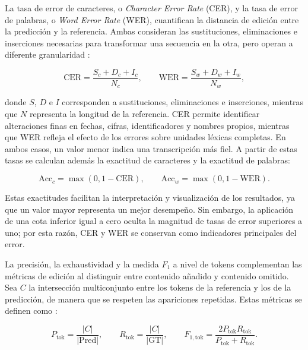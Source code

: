 La tasa de error de caracteres, o \textit{Character Error Rate} (CER), y la tasa de error de palabras, o \textit{Word Error Rate} (WER), cuantifican la distancia de edición entre la predicción y la referencia. Ambas consideran las sustituciones, eliminaciones e inserciones necesarias para transformar una secuencia en la otra, pero operan a diferente granularidad \cite{santos2019ocreval}:

\begin{equation}
    \mathrm{CER}
    =
    \frac{S_c+D_c+I_c}{N_c},
    \qquad
    \mathrm{WER}
    =
    \frac{S_w+D_w+I_w}{N_w},
    \label{eq:cer_wer}
\end{equation}

donde $S$, $D$ e $I$ corresponden a sustituciones, eliminaciones e inserciones, mientras que $N$ representa la longitud de la referencia. CER permite identificar alteraciones finas en fechas, cifras, identificadores y nombres propios, mientras que WER refleja el efecto de los errores sobre unidades léxicas completas. En ambos casos, un valor menor indica una transcripción más fiel. A partir de estas tasas se calculan además la exactitud de caracteres y la exactitud de palabras:

\begin{equation}
    \mathrm{Acc}_{c}=\max(0,1-\mathrm{CER}),
    \qquad
    \mathrm{Acc}_{w}=\max(0,1-\mathrm{WER}).
    \label{eq:character_word_accuracy}
\end{equation}

Estas exactitudes facilitan la interpretación y visualización de los resultados, ya que un valor mayor representa un mejor desempeño. Sin embargo, la aplicación de una cota inferior igual a cero oculta la magnitud de tasas de error superiores a uno; por esta razón, CER y WER se conservan como indicadores principales del error.

La precisión, la exhaustividad y la medida $F_1$ a nivel de tokens complementan las métricas de edición al distinguir entre contenido añadido y contenido omitido. Sea $C$ la intersección multiconjunto entre los tokens de la referencia y los de la predicción, de manera que se respeten las apariciones repetidas. Estas métricas se definen como \cite{powers2011evaluation}:

\begin{equation}
    P_{\mathrm{tok}}
    =
    \frac{|C|}{|\mathrm{Pred}|},
    \qquad
    R_{\mathrm{tok}}
    =
    \frac{|C|}{|\mathrm{GT}|},
    \qquad
    F_{1,\mathrm{tok}}
    =
    \frac{2P_{\mathrm{tok}}R_{\mathrm{tok}}}
         {P_{\mathrm{tok}}+R_{\mathrm{tok}}}.
    \label{eq:token_metrics}
\end{equation}

